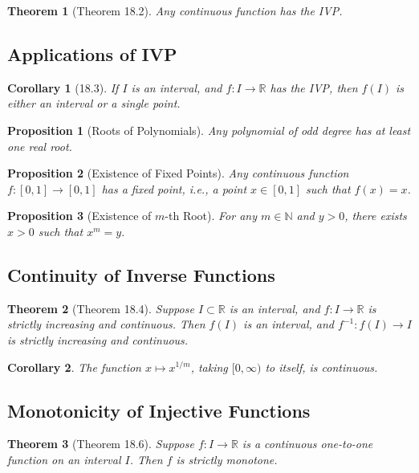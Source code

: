 \documentclass[9pt]{article}
\theoremstyle{definition}
\theoremstyle{plain}
\newtheorem{theorem}{Theorem}
\newtheorem{proposition}{Proposition}
\newtheorem{corollary}{Corollary}
\begin{document}
\begin{theorem}[Theorem 18.2]
Any continuous function has the IVP.
\end{theorem}

\subsection*{Applications of IVP}
\begin{corollary}[18.3]
If \( I \) is an interval, and \( f : I \to \mathbb{R} \) has the IVP, then \( f(I) \) is either an interval or a single point.
\end{corollary}

\begin{proposition}[Roots of Polynomials]
Any polynomial of odd degree has at least one real root.
\end{proposition}

\begin{proposition}[Existence of Fixed Points]
Any continuous function \( f : [0, 1] \to [0, 1] \) has a fixed point, i.e., a point \( x \in [0, 1] \) such that \( f(x) = x \).
\end{proposition}

\begin{proposition}[Existence of \( m \)-th Root]
For any \( m \in \mathbb{N} \) and \( y > 0 \), there exists \( x > 0 \) such that \( x^m = y \).
\end{proposition}

\subsection*{Continuity of Inverse Functions}
\begin{theorem}[Theorem 18.4]
Suppose \( I \subset \mathbb{R} \) is an interval, and \( f : I \to \mathbb{R} \) is strictly increasing and continuous. Then \( f(I) \) is an interval, and \( f^{-1} : f(I) \to I \) is strictly increasing and continuous.
\end{theorem}

\begin{corollary}
The function \( x \mapsto x^{1/m} \), taking \( [0, \infty) \) to itself, is continuous.
\end{corollary}

\subsection*{Monotonicity of Injective Functions}
\begin{theorem}[Theorem 18.6]
Suppose \( f : I \to \mathbb{R} \) is a continuous one-to-one function on an interval \( I \). Then \( f \) is strictly monotone.
\end{theorem}
\end{document}
